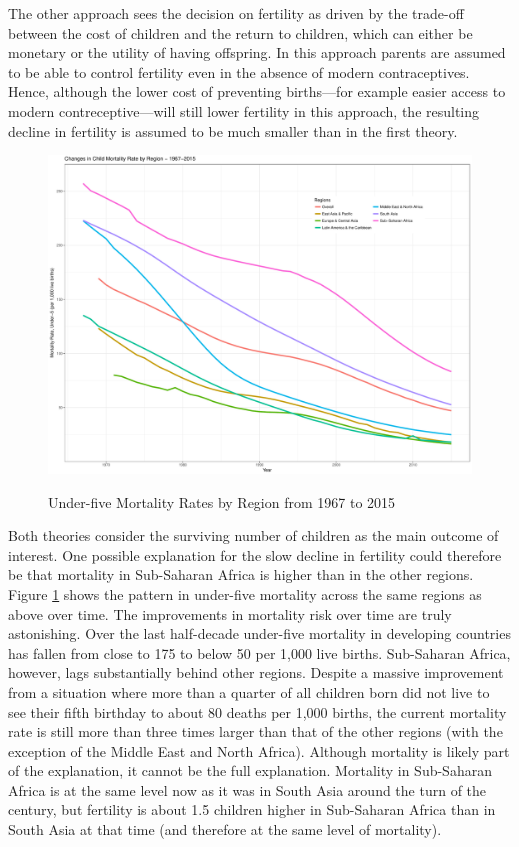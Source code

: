 \documentclass[letterpaper,12pt]{article}
\begin{document}
The other approach sees the decision on fertility as driven by the
trade-off between the cost of children and the return to children, which
can either be monetary or the utility of having offspring.
In this approach parents are assumed to be able to control fertility
even in the absence of modern contraceptives.
Hence, although the lower cost of preventing births---for example easier
access to modern contreceptive---will still lower fertility in this
approach, the resulting decline in fertility is assumed to be much
smaller than in the first theory.

\begin{figure}[hp!]
    \centering
    \caption{Under-five Mortality Rates by Region from 1967 to 2015}
    \includegraphics[width=0.75\linewidth]{../figures/childMortalityRates.pdf}
    \label{fig:mortality}
\end{figure}

Both theories consider the surviving number of children as the main
outcome of interest.
One possible explanation for the slow decline in fertility could
therefore be that mortality in Sub-Saharan Africa is higher than in the
other regions.
Figure \ref{fig:mortality} shows the pattern in under-five mortality across
the same regions as above over time.
The improvements in mortality risk over time are truly astonishing.
Over the last half-decade under-five mortality in developing countries has
fallen from close to 175 to below 50 per 1,000 live births.
Sub-Saharan Africa, however, lags substantially behind other regions.
Despite a massive improvement from a situation where more than a quarter
of all children born did not live to see their fifth birthday to about
80 deaths per 1,000 births, the current mortality rate is still more
than three times larger than that of the other regions (with the
exception of the Middle East and North Africa).
Although mortality is likely part of the explanation, it cannot be the
full explanation.
Mortality in Sub-Saharan Africa is at the same level now as it was in
South Asia around the turn of the century, but fertility is about 1.5
children higher in Sub-Saharan Africa than in South Asia at that time
(and therefore at the same level of mortality).
\end{document}

